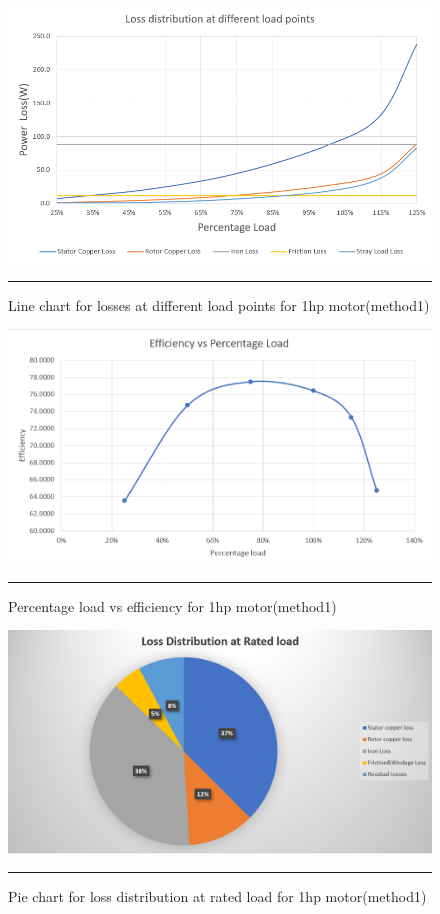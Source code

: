 \begin{figure}[hbtp!]
	\centering
		\includegraphics[width = 4.5in]{./Figures/MS/fig55.png}
		\rule{35em}{0.5pt}
	\caption{Line chart for losses at different load points for 1hp motor(method1)}
	\label{fig:Line chart for losses at different load points for 1hp motor(method1)} 
\end{figure}

\begin{figure}[hbtp!]
	\centering
		\includegraphics[width = 4.5in]{./Figures/MS/fig56.png}
		\rule{35em}{0.5pt}
	\caption{Percentage load vs efficiency for 1hp motor(method1)}
	\label{fig:Percentage load vs efficiency for 1hp motor(method1)} 
\end{figure}

\begin{figure}[hbtp!]
	\centering
		\includegraphics[width = 4.5in]{./Figures/MS/fig57.png}
		\rule{35em}{0.5pt}
	\caption{Pie chart for loss distribution at rated load for 1hp motor(method1)}
	\label{fig:Pie chart for loss distribution at rated load for 1hp motor(method1)} 
\end{figure}

